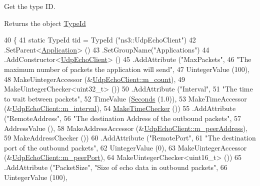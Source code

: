 Get the type ID. 

\begin{DoxyReturn}{Returns}
the object \hyperlink{classns3_1_1TypeId}{Type\+Id} 
\end{DoxyReturn}

\begin{DoxyCode}
40 \{
41   \textcolor{keyword}{static} TypeId tid = TypeId (\textcolor{stringliteral}{"ns3::UdpEchoClient"})
42     .SetParent<\hyperlink{classns3_1_1Application_acd261926c72b02cdb48fc7f8838ee173}{Application}> ()
43     .SetGroupName(\textcolor{stringliteral}{"Applications"})
44     .AddConstructor<\hyperlink{classns3_1_1UdpEchoClient_ab3c277a6cd1da6cb63863957fde994b1}{UdpEchoClient}> ()
45     .AddAttribute (\textcolor{stringliteral}{"MaxPackets"}, 
46                    \textcolor{stringliteral}{"The maximum number of packets the application will send"},
47                    UintegerValue (100),
48                    MakeUintegerAccessor (&\hyperlink{classns3_1_1UdpEchoClient_a710824f60e09811300bd9196bd858ba1}{UdpEchoClient::m\_count}),
49                    MakeUintegerChecker<uint32\_t> ())
50     .AddAttribute (\textcolor{stringliteral}{"Interval"}, 
51                    \textcolor{stringliteral}{"The time to wait between packets"},
52                    TimeValue (\hyperlink{group__timecivil_ga33c34b816f8ff6628e33d5c8e9713b9e}{Seconds} (1.0)),
53                    MakeTimeAccessor (&\hyperlink{classns3_1_1UdpEchoClient_a15b358eed30957c2f6febcb989b1eb59}{UdpEchoClient::m\_interval}),
54                    \hyperlink{group__time_ga7032965bd4afa578691d88c09e4481c1}{MakeTimeChecker} ())
55     .AddAttribute (\textcolor{stringliteral}{"RemoteAddress"}, 
56                    \textcolor{stringliteral}{"The destination Address of the outbound packets"},
57                    AddressValue (),
58                    MakeAddressAccessor (&\hyperlink{classns3_1_1UdpEchoClient_a93144bb99de23e9e585a6208705b634d}{UdpEchoClient::m\_peerAddress}),
59                    MakeAddressChecker ())
60     .AddAttribute (\textcolor{stringliteral}{"RemotePort"}, 
61                    \textcolor{stringliteral}{"The destination port of the outbound packets"},
62                    UintegerValue (0),
63                    MakeUintegerAccessor (&\hyperlink{classns3_1_1UdpEchoClient_ad0c121fcf7f16062990312ca26c8dcc0}{UdpEchoClient::m\_peerPort}),
64                    MakeUintegerChecker<uint16\_t> ())
65     .AddAttribute (\textcolor{stringliteral}{"PacketSize"}, \textcolor{stringliteral}{"Size of echo data in outbound packets"},
66                    UintegerValue (100),

\end{DoxyCode}
